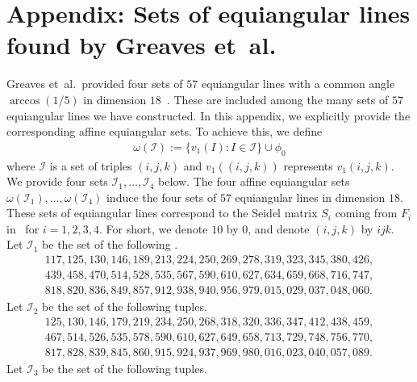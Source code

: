 \documentclass[reqno, 11pt]{amsart}
\numberwithin{equation}{section}
\theoremstyle{definition}
\newcommand{\cI}{\mathcal{I}}
\newcommand{\aes}{\omega}
\begin{document}
\section*{Appendix: Sets of equiangular lines found by Greaves et~al.} \label{sec:Greaves}
Greaves et~al.\ provided four sets of $57$ equiangular lines with a common angle $\arccos(1/5)$ in dimension $18$~\cite{Greaves2023}.
These are included among the many sets of $57$ equiangular lines we have constructed.
In this appendix, we explicitly provide the corresponding affine equiangular sets.
To achieve this, we define
\begin{align*}
	\aes(\cI) := \{ v_1(I) : I \in \cI \} \cup \phi_0
\end{align*}
where $\cI$ is a set of triples $(i,j,k)$ and $v_1((i,j,k))$ represents $v_1(i,j,k)$.
We provide four sets $\cI_1, \ldots, \cI_4$ below.
The four affine equiangular sets $\aes(\cI_1), \ldots, \aes(\cI_4)$ induce the four sets of $57$ equiangular lines in dimension $18$.
These sets of equiangular lines correspond to the Seidel matrix $S_i$ coming from $F_i$ in~\cite{Greaves2023} for $i = 1,2,3,4$.
For short, we denote $10$ by $0$, and denote $(i,j,k)$ by $ijk$.
Let $\cI_1$ be the set of the following .
\begin{align*}
	1 1 7 ,
	1 2 5 ,
	1 3 0 ,
	1 4 6 ,
	1 8 9 ,
	2 1 3 ,
	2 2 4 ,
	2 5 0 ,
	2 6 9 ,
	2 7 8 ,
	3 1 9 ,
	3 2 3 ,
	3 4 5 ,
	3 8 0 ,
	4 2 6 , \\
	4 3 9 ,
	4 5 8 ,
	4 7 0 ,
	5 1 4 ,
	5 2 8 ,
	5 3 5 ,
	5 6 7 ,
	5 9 0 ,
	6 1 0 ,
	6 2 7 ,
	6 3 4 ,
	6 5 9 ,
	6 6 8 ,
	7 1 6 ,
	7 4 7 , \\
	8 1 8 ,
	8 2 0 ,
	8 3 6 ,
	8 4 9 ,
	8 5 7 ,
	9 1 2 ,
	9 3 8 ,
	9 4 0 ,
	9 5 6 ,
	9 7 9 ,
	0 1 5 ,
	0 2 9 ,
	0 3 7 ,
	0 4 8 ,
	0 6 0 .
\end{align*}
Let $\cI_2$ be the set of the following tuples.
\begin{align*}
	1 2 5 ,
	1 3 0 ,
	1 4 6 ,
	1 7 9 ,
	2 1 9 ,
	2 3 4 ,
	2 5 0 ,
	2 6 8 ,
	3 1 8 ,
	3 2 0 ,
	3 3 6 ,
	3 4 7 ,
	4 1 2 ,
	4 3 8 ,
	4 5 9 , \\
	4 6 7 ,
	5 1 4 ,
	5 2 6 ,
	5 3 5 ,
	5 7 8 ,
	5 9 0 ,
	6 1 0 ,
	6 2 7 ,
	6 4 9 ,
	6 5 8 ,
	7 1 3 ,
	7 2 9 ,
	7 4 8 ,
	7 5 6 ,
	7 7 0 , \\
	8 1 7 ,
	8 2 8 ,
	8 3 9 ,
	8 4 5 ,
	8 6 0 ,
	9 1 5 ,
	9 2 4 ,
	9 3 7 ,
	9 6 9 ,
	9 8 0 ,
	0 1 6 ,
	0 2 3 ,
	0 4 0 ,
	0 5 7 ,
	0 8 9 .
\end{align*}
Let $\cI_3$ be the set of the following tuples.
\end{document}
